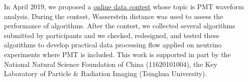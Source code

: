\acknowledgments
In April 2019, we proposed a \href{https://mp.weixin.qq.com/s?__biz=MzA4MTAwMzgzOA==&mid=2650872289&idx=2&sn=48145a6598545d201f940e0459de99dd&chksm=846e2db0b319a4a627e902d0d6ed4b9d968225566021342c5935764963f352fbe02db1bdb333&mpshare=1&scene=1&srcid=0307c4HOvK0ChJUcq9blC3ub%23rd}{online data contest} whose topic is PMT waveform analysis. During the contest, Wasserstein distance was used to assess the performance of algorithms. After the contest, we collected several algorithms submitted by participants and we checked, redesigned, and tested these algorithms to develop practical data processing flow applied on neutrino experiments where PMT is included. This work is supported in part by the National Natural Science Foundation of China (11620101004), the Key Laboratory of Particle \& Radiation Imaging (Tsinghua University). 

